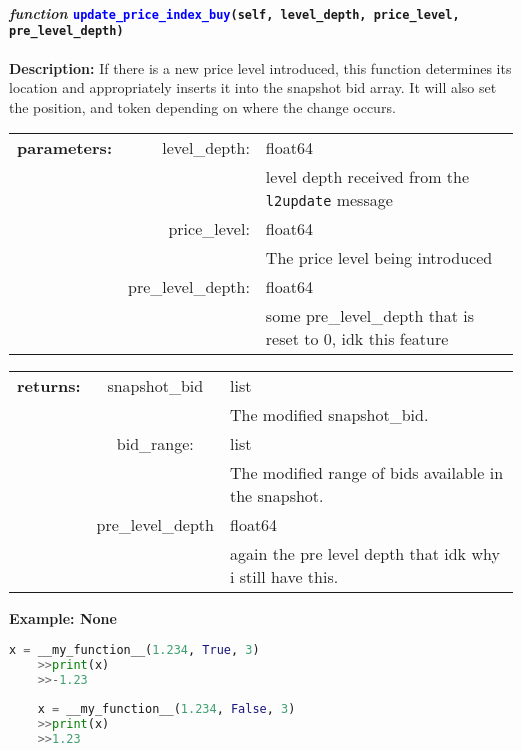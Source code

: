 \paragraph{\textit{function} \textcolor{blue}{\texttt{update\_price\_index\_buy}}\texttt{(self, level\_depth, price\_level, pre\_level\_depth)}}\hfill\break
\noindent \textbf{Description:} If there is a new price level introduced, this function determines its location and appropriately inserts it into the snapshot bid array. It will also set the position, and token depending on where the change occurs. 

\begin{tabular}{r r l }
	\textbf{parameters:}	& level\_depth: & float64\\
	&  & level depth received from the \texttt{l2update} message\\
	& price\_level:& float64\\
	&& The price level being introduced\\
	& pre\_level\_depth:& float64\\
	&& some pre\_level\_depth that is reset to 0, idk this feature
\end{tabular}

\begin{tabular}{l c l}
	\textbf{returns:} & snapshot\_bid & list\\
	& & The modified snapshot\_bid.\\
	& bid\_range: & list \\
	&& The modified range of bids available in the snapshot.\\
	&pre\_level\_depth &float64\\
	&& again the pre level depth that idk why i still have this.\\
\end{tabular}

\textbf{Example: None}
\begin{lstlisting}[language=Python]
	x = __my_function__(1.234, True, 3)
	>>print(x)
	>>-1.23
	
	x = __my_function__(1.234, False, 3)
	>>print(x)
	>>1.23
\end{lstlisting}